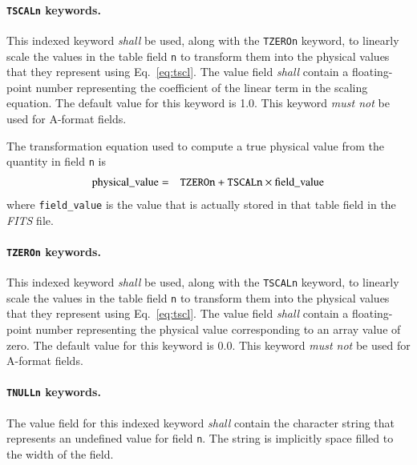 \documentclass[onecolumn]{aa}
\begin{document}
   \paragraph{{\tt TSCALn} keywords.}
   This indexed keyword {\em shall} be used, along with the {\tt TZEROn}
 keyword, to linearly scale the values in the table field {\tt n}
 to transform them
 into the physical values that they
 represent using Eq.~\ref{eq:tscl}. The value field {\em shall}
 contain a floating-point number representing the coefficient of
 the linear term in the scaling equation.  The
 default value for this keyword is 1.0.  
 This keyword {\em must not} be used for A-format fields.

 The transformation equation used to compute a true
 physical value from the quantity in field {\tt n} is
\begin{eqnarray}                                      
   \mbox{physical\_value} & = & \mbox{{\tt TZEROn}} + \mbox{{\tt TSCALn}}
                               \times \mbox{field\_value} \label{eq:tscl}
\end{eqnarray}
\noindent
where {\tt field\_value} is the value that is actually stored in that table field 
in the {\em FITS\/} file.

   \paragraph{{\tt TZEROn} keywords.}
 This indexed keyword {\em shall} be used, along with the {\tt TSCALn}
 keyword, to linearly scale the values in the table field {\tt n}
 to transform them
 into the physical  values that they
 represent using Eq.~\ref{eq:tscl}. The value field {\em shall}
 contain a floating-point number representing the physical value
 corresponding to an array value of zero.  The default value for
 this  keyword is 0.0.  This keyword {\em must not} 
 be used for A-format fields.

   \paragraph{{\tt TNULLn} keywords.}
 The value field for this indexed keyword {\em shall} contain 
 the character
 string that represents 
 an undefined value for field {\tt n}. 
 The string is implicitly space filled to the width of the field.
 
\end{document}
